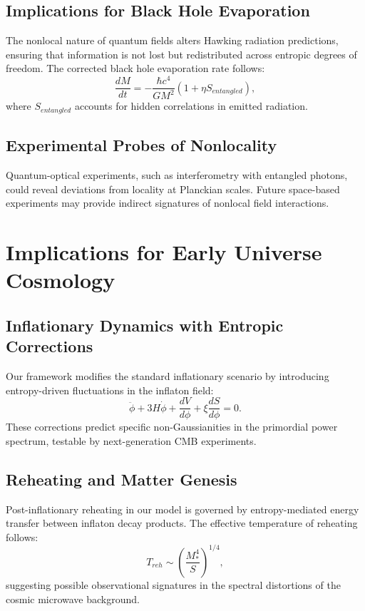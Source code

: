 \documentclass{article}
\begin{document}
\subsection{Implications for Black Hole Evaporation}
The nonlocal nature of quantum fields alters Hawking radiation predictions, ensuring that information is not lost but redistributed across entropic degrees of freedom. The corrected black hole evaporation rate follows:
\begin{equation}
\frac{dM}{dt} = -\frac{\hbar c^4}{G M^2} \left(1 + \eta S_{entangled} \right),
\end{equation}
where $S_{entangled}$ accounts for hidden correlations in emitted radiation.

\subsection{Experimental Probes of Nonlocality}
Quantum-optical experiments, such as interferometry with entangled photons, could reveal deviations from locality at Planckian scales. Future space-based experiments may provide indirect signatures of nonlocal field interactions.

\section{Implications for Early Universe Cosmology}

\subsection{Inflationary Dynamics with Entropic Corrections}
Our framework modifies the standard inflationary scenario by introducing entropy-driven fluctuations in the inflaton field:
\begin{equation}
\ddot{\phi} + 3H \dot{\phi} + \frac{dV}{d\phi} + \xi \frac{dS}{d\phi} = 0.
\end{equation}
These corrections predict specific non-Gaussianities in the primordial power spectrum, testable by next-generation CMB experiments.

\subsection{Reheating and Matter Genesis}
Post-inflationary reheating in our model is governed by entropy-mediated energy transfer between inflaton decay products. The effective temperature of reheating follows:
\begin{equation}
T_{reh} \sim \left(\frac{M_*^4}{S} \right)^{1/4},
\end{equation}
suggesting possible observational signatures in the spectral distortions of the cosmic microwave background.
\end{document}
